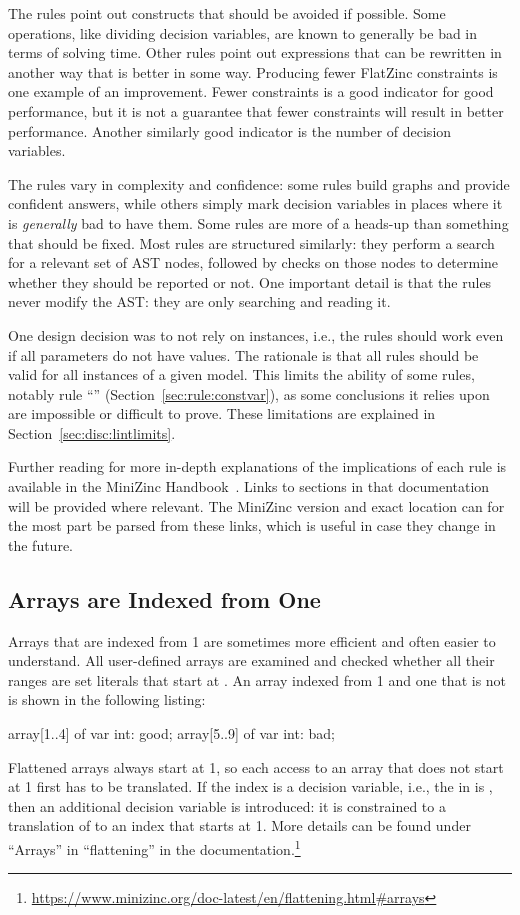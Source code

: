 \documentclass[a4paper,12pt]{article}
\newcommand{\ruleref}[1]{``\nameref{sec:rule:#1}'' (Section~\ref{sec:rule:#1})}
\begin{document}
The rules point out constructs that should be avoided if possible. Some operations,
like dividing decision variables, are known to generally be bad in terms of solving time.
Other rules point out expressions that can be rewritten in another way that is better in
some way. Producing fewer FlatZinc constraints is one example of an improvement. Fewer
constraints is a good indicator for good performance, but it is not a guarantee that fewer
constraints will result in better performance. Another similarly good indicator is the
number of decision variables.

The rules vary in complexity and confidence: some rules build graphs and provide
confident answers, while others simply mark decision variables in places where it is
\emph{generally} bad to have them. Some rules are more of a heads-up than something that
should be fixed. Most rules are structured similarly: they perform a search for
a relevant set of AST nodes, followed by checks on those nodes to determine whether they
should be reported or not. One important detail is that the rules never modify the AST: they
are only searching and reading it.

One design decision was to not rely on instances, i.e., the rules should work even if all
parameters do not have values. The rationale is that all rules should be valid for all
instances of a given model. This limits the ability of some rules, notably rule
\ruleref{constvar}, as some conclusions it relies upon are impossible or difficult to prove.
These limitations are explained in Section~\ref{sec:disc:lintlimits}.

Further reading for more in-depth explanations of the implications of each rule is
available in the MiniZinc Handbook~\cite{mznbook}. Links to sections in that documentation
will be provided where relevant. The MiniZinc version and exact location can for the most
part be parsed from these links, which is useful in case they change in the future.

\subsection{Arrays are Indexed from One}\label{sec:rule:arrayatone}
Arrays that are indexed from 1 are sometimes more efficient and often easier to understand.
All user-defined arrays are examined and checked whether all their ranges are set
literals that start at .
An array indexed from 1 and one that is not is shown in the following listing:
\begin{mznnobreak}
array[1..4] of var int: good;
array[5..9] of var int: bad;
\end{mznnobreak}
Flattened arrays always start at 1, so each access to an array that does not start at
1 first has to be translated. If the index is a decision variable, i.e., the  in  is
, then an additional decision variable is introduced: it is constrained to a translation of  to an index that
starts at 1. More details can be found under ``Arrays'' in ``flattening'' in the
documentation.\footnote{\url{https://www.minizinc.org/doc-latest/en/flattening.html\#arrays}}
\end{document}
